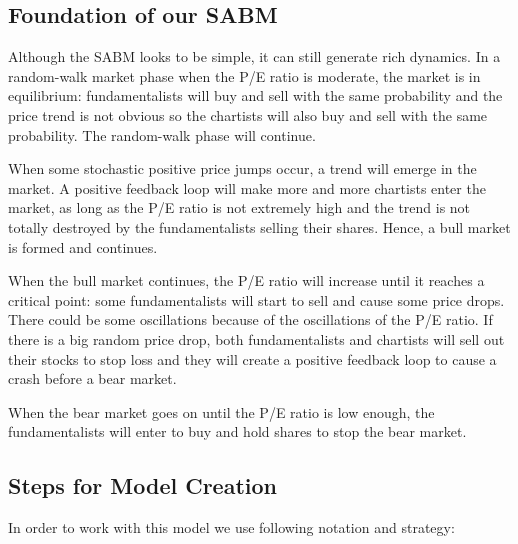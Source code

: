 \subsection{Foundation of our SABM}

Although the SABM looks to be simple, it can still generate rich dynamics. In a random-walk market phase when the P/E ratio is moderate, the market is in equilibrium: fundamentalists will buy and sell with the
same probability and the price trend is not obvious so the chartists will also buy and sell with the same probability. The random-walk phase will continue. \par
When some stochastic positive price jumps occur, a trend will emerge in the market. A positive feedback loop will make more and more chartists enter the market, as long as the P/E ratio is not extremely
high and the trend is not totally destroyed by the fundamentalists selling their shares. Hence, a bull market is formed and continues. \par
When the bull market continues, the P/E ratio will increase until it reaches a critical point: some fundamentalists will start to sell and cause some price drops. There could be some oscillations because of the oscillations of the P/E ratio. If there is a big random price drop, both fundamentalists and chartists will sell out their stocks to stop loss and they will create a positive feedback loop to cause a crash
before a bear market. \par
When the bear market goes on until the P/E ratio is low enough, the fundamentalists will enter to buy and hold shares to stop the bear market.


\subsection{Steps for Model Creation} \label{steps}

In order to work with this model we use following notation and strategy:

